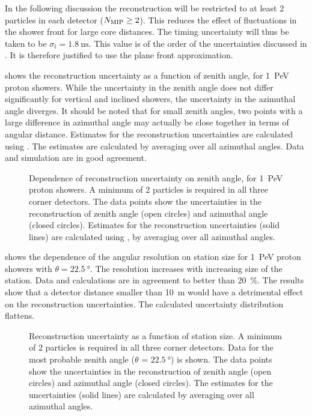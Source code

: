 In the following discussion the reconstruction will be
restricted to at least 2 particles in each detector ($N_\mathrm{\mip} \geq 2$).
This reduces the effect of fluctuations in the shower front for large core
distances. The timing uncertainty will thus be taken to be $\sigma_t =
\SI{1.8}{\nano\second}$. This value is of the order of the
uncertainties discussed in . It is therefore
justified to use the plane front approximation.

 shows the reconstruction uncertainty as a
function of zenith angle, for \SI{1}{\peta\electronvolt} proton showers. While
the uncertainty in the zenith angle does not differ significantly for vertical
and inclined showers, the uncertainty in the azimuthal angle diverges. It should
be noted that for small zenith angles, two points with a large difference in
azimuthal angle may actually be close together in terms of angular distance.
Estimates for the reconstruction uncertainties are calculated using
. The estimates are calculated by averaging over all
azimuthal angles. Data and simulation are in good agreement.

\begin{figure}
\centering

\caption{Dependence of reconstruction uncertainty on zenith angle, for
\SI{1}{\peta\electronvolt} proton showers.  A minimum of 2 particles is required
in all three corner detectors.  The data points show the uncertainties in
the reconstruction of zenith angle (open circles) and azimuthal angle
(closed circles).  Estimates for the reconstruction uncertainties (solid
lines) are calculated using , by
averaging over all azimuthal angles.}
\label{fig:results-sim-zenith}
\end{figure}

 shows the dependence of the angular resolution on
station size for \SI{1}{\peta\electronvolt} proton showers with $\theta =
\SI{22.5}{\degree}$.   The resolution increases with increasing size of the
station.
Data and calculations are in agreement to better than \SI{20}{\percent}. The
results show that a detector distance smaller than \SI{10}{\meter} would have a
detrimental effect on the reconstruction uncertainties. The calculated
uncertainty distribution
flattens.

\begin{figure}
\centering

\caption{Reconstruction uncertainty as a function of station size.  A
minimum of 2 particles is required in all three corner detectors.  Data
for the most probable zenith angle ($\theta$ = $\SI{22.5}{\degree}$) is
shown.  The data points show the uncertainties in the reconstruction of
zenith angle (open circles) and azimuthal angle (closed circles).  The
estimates for the uncertainties (solid lines) are calculated by averaging
over all azimuthal angles.}
\label{fig:results-size}
\end{figure}

